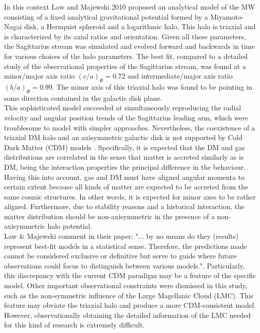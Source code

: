 In this context Law and Majewski 2010 proposed an analytical model of the MW consisting of a fixed analytical gravitational potential formed by a Miyamoto-Nagai \cite{Miyamoto-Nagai 1985} disk, a Hernquist spheroid and a logarithmic halo. 
This halo is triaxial and is characterized by its axial ratios and orientation. 
Given all these parameters, the Sagittarius stream was simulated and evolved forward and backwards in time for various choices of the halo parameters. 
The best fit, compared to a detailed study of the observational properties of the Sagittarius stream, was found at a minor/major axis ratio $(c/a)_{\Phi}=0.72$ and intermediate/major axis ratio $(b/a)_{\Phi}=0.99$. The minor axis of this triaxial halo was found to be pointing in some direction contained in the galactic disk plane. \\

This sophisticated model succeeded at simultaneously reproducing the radial velocity and angular position trends of the Sagittarius leading arm, which were troublesome to model with simpler approaches. 
Nevertheless, the coexistence of a triaxial DM halo and an axisymmetric galactic disk is not supported by Cold Dark Matter (CDM) models \cite{Debattista et al. 2008}. 
Specifically, it is expected that the DM and gas distributions are correlated in the sense that matter is accreted similarly as is DM, being the interaction properties the principal difference in the behaviour. 
Having this into account, gas and DM must have aligned angular momenta to certain extent because all kinds of matter are expected to be accreted from the same cosmic structures. 
In other words, it is expected for minor axes to be rather aligned. 
Furthermore, due to stability reasons and a historical interaction, the matter distribution should be non-axisymmetric in the presence of a non-axisymmetric halo potential.\\

Law \& Majewski comment in their paper: "... by no means do they (results) represent best-fit models in a statistical sense. Therefore, the predictions made cannot be considered exclusive or definitive but serve to guide where future observations could focus to distinguish between various models.". 
Particularly, this discrepancy with the current CDM paradigm may be a feature of the specific model. 
Other important observational constraints were dismissed in this study, such as the non-symmetric influence of the Large Magellanic Cloud (LMC). 
This feature may obviate the triaxial halo and produce a more CDM-consistent model. 
However, observationally obtaining the detailed information of the LMC needed for this kind of research is extremely difficult.\\

